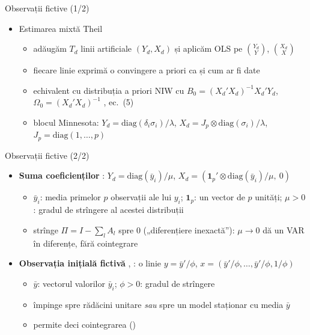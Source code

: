 \begin{frame}{Observații fictive (1/2)}
\itemsize{\small}
\begin{itemize}
    \item Estimarea mixtă Theil
    \begin{itemize}
        \item adăugăm $T_d$ linii artificiale $(Y_d, X_d)$ și aplicăm OLS pe $\binom{Y_d}{Y}$, $\binom{X_d}{X}$
        \item fiecare linie exprimă o convingere a priori ca și cum ar fi date
        \item echivalent cu distribuția a priori NIW cu $B_0 = (X_d'X_d)^{-1}X_d'Y_d$, $\Omega_0 = (X_d'X_d)^{-1}$ , ec.~(5)
        \item blocul Minnesota: $Y_d = \mathrm{diag}(\delta_i\sigma_i)/\lambda$, $X_d = J_p\otimes\mathrm{diag}(\sigma_i)/\lambda$, $J_p = \mathrm{diag}(1, \dots, p)$
    \end{itemize}
\end{itemize}
\end{frame}

\begin{frame}{Observații fictive (2/2)}
\itemsize{\small}
\begin{itemize}
    \item \textbf{Suma coeficienților} : $Y_d = \mathrm{diag}(\bar y_i)/\mu$, $X_d = (\mathbf{1}_p'\otimes\mathrm{diag}(\bar y_i)/\mu,\ 0)$
    \begin{itemize}
        \item $\bar y_i$: media primelor $p$ observații ale lui $y_i$; $\mathbf{1}_p$: un vector de $p$ unități; $\mu > 0$: gradul de strîngere al acestei distribuții
        \item strînge $\Pi = I - \sum_l A_l$ spre 0 („diferențiere inexactă”): $\mu \to 0$ dă un VAR în diferențe, fără cointegrare
    \end{itemize}
    \item \textbf{Observația inițială fictivă} , : o linie $y = \bar y'/\phi$, $x = (\bar y'/\phi, \dots, \bar y'/\phi, 1/\phi)$
    \begin{itemize}
        \item $\bar y$: vectorul valorilor $\bar y_i$; $\phi > 0$: gradul de strîngere
        \item împinge spre rădăcini unitare \emph{sau} spre un model staționar cu media $\bar y$
        \item permite deci cointegrarea ()
    \end{itemize}
\end{itemize}
\end{frame}

